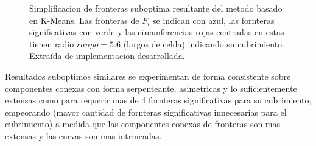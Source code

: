 \begin{figure}[H]
  \centering
  \qquad

  \caption[Simplificacion de fronteras suboptima resultante del metodo basado en K-Means.]{Simplificacion de fronteras suboptima resultante del metodo basado en K-Means. Las fronteras de $F_i$ se indican con azul, las fornteras significativas con verde y las
    circunferencias rojas centradas en estas tienen radio $rango=5.6$ (largos de celda) indicando su
    cubrimiento. Extraída de implementacion desarrollada\footnotemark.}\label{fig:ejemploFSKMMal}
\end{figure}

Resultados suboptimos similares se experimentan de forma consistente %
sobre componentes conexas con forma serpenteante,
asimetricas y lo suficientemente extensas como para requerir mas de 4
fornteras significativas para su cubrimiento, 
empeorando (mayor cantidad de fornteras significativas
innecesarias para el cubrimiento) a medida que las componentes conexas de
fronteras son mas extensas y las curvas son mas intrincadas.

